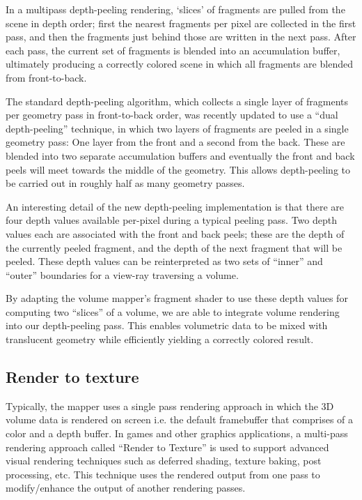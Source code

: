 In a multipass depth-peeling rendering, `slices' of fragments are pulled from
the scene in depth order; first the nearest fragments per pixel are collected in
the first pass, and then the fragments just behind those are written in the next
pass. After each pass, the current set of fragments is blended into an
accumulation buffer, ultimately producing a correctly colored scene in which all
fragments are blended from front-to-back.

The standard depth-peeling algorithm, which collects a single layer of fragments
per geometry pass in front-to-back order, was recently updated to use a ``dual
depth-peeling'' technique\cite{dualdepthwhitepaper}, in which two layers of
fragments are peeled in a single geometry pass: One layer from the front and a
second from the back. These are blended into two separate accumulation buffers
and eventually the front and back peels will meet towards the middle of the
geometry. This allows depth-peeling to be carried out in roughly half as many
geometry passes.

An interesting detail of the new depth-peeling implementation is that there are
four depth values available per-pixel during a typical peeling pass. Two depth
values each are associated with the front and back peels; these are the depth of
the currently peeled fragment, and the depth of the next fragment that will be
peeled. These depth values can be reinterpreted as two sets of ``inner'' and
``outer'' boundaries for a view-ray traversing a volume.

By adapting the volume mapper's fragment shader to use these depth values for
computing two ``slices'' of a volume, we are able to integrate volume rendering
into our depth-peeling pass. This enables volumetric data to be mixed with
translucent geometry while efficiently yielding a correctly colored result.
 
\subsection{Render to texture} Typically, the mapper uses a single pass
rendering approach in which the 3D volume data is rendered on screen i.e. the
default framebuffer that comprises of a color and a depth buffer. In games and
other graphics applications, a multi-pass rendering approach called ``Render to
Texture'' is used to support advanced visual rendering techniques such as
deferred shading, texture baking, post processing, etc. This technique uses the
rendered output from one pass to modify/enhance the output of another rendering
passes. 

